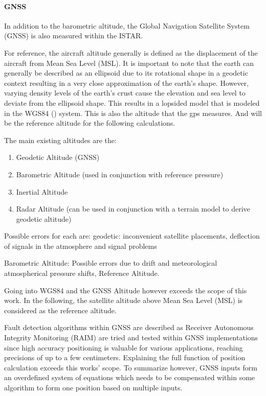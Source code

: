 \paragraph{GNSS}
In addition to the barometric altitude, the Global Navigation Satellite System (GNSS) is also measured within the ISTAR.

For reference, the aircraft altitude generally is defined as the displacement of the aircraft from Mean Sea Level (MSL). It is important to note that the earth can generally be described as an ellipsoid due to its rotational shape in a geodetic context resulting in a very close approximation of the earth's shape. However, varying density levels of the earth's crust cause the elevation and sea level to deviate from the ellipsoid shape. This results in a lopsided model that is modeled in the WGS84 (\cite{schwarz_wgs_1998}) system. This is also the altitude that the gps measures. And will be the reference altitude for the following calculations.

The main existing altitudes are the:
\begin{enumerate}
    \item Geodetic Altitude (GNSS)
    \item Barometric Altitude (used in conjunction with reference pressure)
    \item Inertial Altitude
    \item Radar Altitude (can be used in conjunction with a terrain model to derive geodetic altitude)
\end{enumerate}


Possible errors for each are: geodetic: inconvenient satellite placements, deflection of signals in the atmosphere and signal problems


Barometric Altitude: Possible errors due to drift and meteorological atmospherical pressure shifts, Reference Altitude.

Going into WGS84 and the GNSS Altitude however exceeds the scope of this work. In the following, the satellite altitude above Mean Sea Level (MSL) is considered as the reference altitude.


Fault detection algorithms within GNSS are described as Receiver Autonomous Integrity Monitoring (RAIM) are tried and tested within GNSS implementations since high accuracy positioning is valuable for various applications, reaching precisions of up to a few centimeters. Explaining the full function of position calculation exceeds this works' scope. To summarize however, GNSS inputs form an overdefined system of equations which needs to be compensated within some algorithm to form one position based on multiple inputs.


